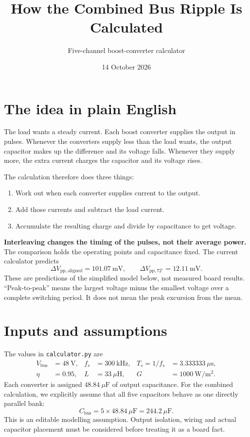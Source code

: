 \documentclass[11pt,a4paper]{article}
\title{How the Combined Bus Ripple Is Calculated}
\author{Five-channel boost-converter calculator}
\date{14 October 2026}
\begin{document}
\maketitle

\section{The idea in plain English}

The load wants a steady current. Each boost converter supplies the output in
pulses. Whenever the converters supply less than the load wants, the output
capacitor makes up the difference and its voltage falls. Whenever they supply
more, the extra current charges the capacitor and its voltage rises.

The calculation therefore does three things:
\begin{enumerate}
  \item Work out when each converter supplies current to the output.
  \item Add those currents and subtract the load current.
  \item Accumulate the resulting charge and divide by capacitance to get voltage.
\end{enumerate}

\textbf{Interleaving changes the timing of the pulses, not their average power.}
The comparison holds the operating points and capacitance fixed. The current
calculator predicts
\[
  \boxed{\Delta V_{\mathrm{pp,aligned}}=101.07\ \mathrm{mV}},\qquad
  \boxed{\Delta V_{\mathrm{pp,72^\circ}}=12.11\ \mathrm{mV}}.
\]
These are predictions of the simplified model below, not measured board results.
``Peak-to-peak'' means the largest voltage minus the smallest voltage over a
complete switching period. It does not mean the peak excursion from the mean.

\section{Inputs and assumptions}

The values in \texttt{calculator.py} are
\begin{align*}
  V_{\mathrm{bus}} &=48\ \mathrm{V}, &
  f_s &=300\ \mathrm{kHz}, & T_s=1/f_s&=3.333333\ \mu\mathrm{s},\\
  \eta &=0.95, & L&=33\ \mu\mathrm{H}, & G&=1000\ \mathrm{W/m^2}.
\end{align*}
Each converter is assigned $48.84\ \mu\mathrm{F}$ of output capacitance.
For the combined calculation, we explicitly assume that all five capacitors
behave as one directly parallel bank:
\[
 C_{\mathrm{bus}}=5\times48.84\ \mu\mathrm{F}=244.2\ \mu\mathrm{F}.
\]
This is an editable modelling assumption. Output isolation, wiring and actual
capacitor placement must be considered before treating it as a board fact.
\end{document}
